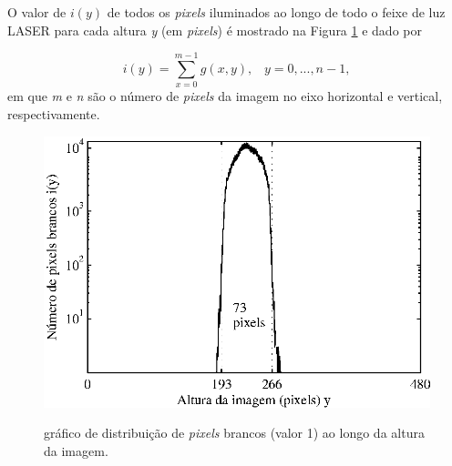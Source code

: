 O valor de $i(y)$ de todos os \textit{pixels} iluminados ao longo de todo o feixe de luz LASER para cada altura \textit{y} (em \textit{pixels}) \'{e} mostrado na Figura \ref{grafico_diametro} e dado por



\begin{equation}
 \label{iy}
i(y)  = \sum\limits_{x = 0}^{m - 1} {g(x,y)}, \;\;\;y = 0,...,n - 1,
\end{equation}
em que \emph{m} e \emph{n} s\~{a}o  o n\'{u}mero de \textit{pixels} da imagem no eixo horizontal e vertical, respectivamente.


\begin{figure}[hbt]
\begin{center}
\includegraphics[scale=0.9]{eps/diametroLASER3.eps}\\
\end{center}
\centering \caption{\label{grafico_diametro}\hspace{-0.1em} gr\'{a}fico de distribui\c{c}\~{a}o de \textit{pixels} brancos (valor 1) ao longo da altura da imagem.}
\end{figure}


